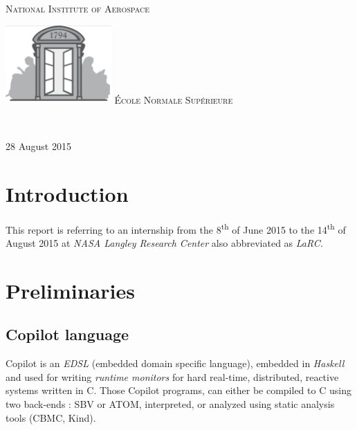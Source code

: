 \documentclass[a4paper,11pt,final]{article}
\begin{document}
\begin{titlepage}
\begin{center}
\begin{minipage}[t]{0.25\textwidth}
\begin{flushleft}
					\textsc{\LARGE National Institute of Aerospace}
				\end{flushleft}
			\end{minipage}
			\begin{minipage}[t]{0.25\textwidth}
				\begin{flushleft}
					\includegraphics[height=30mm]{images/ENS logo.jpg}
					\textsc{\LARGE École Normale Supérieure}
				\end{flushleft}
			\end{minipage} \\[1.5cm]
			\vfill
			
			{\large 28 August 2015}
			
		\end{center}
		
	\end{titlepage}
	
	
	\cleardoublepage %
	\tableofcontents %
	\sloppy          %
	\cleardoublepage
	
	\cleardoublepage
	\section*{Introduction}
	This report is referring to an internship from the 8\textsuperscript{th} of June 2015 to the 14\textsuperscript{th} of August 2015 at \emph{NASA Langley Research Center} also abbreviated as \emph{LaRC}.
	
	
	\section{Preliminaries}
	\subsection{Copilot language}
	Copilot is an \emph{EDSL} (embedded domain specific language), embedded in \emph{Haskell} and used for writing \emph{runtime monitors} for hard real-time, distributed, reactive systems written in C\cite{Copilot01}. Those Copilot programs, can either be compiled to C using two back-ends : SBV or ATOM, interpreted, or analyzed using static analysis tools (CBMC, Kind).
	
\end{document}
